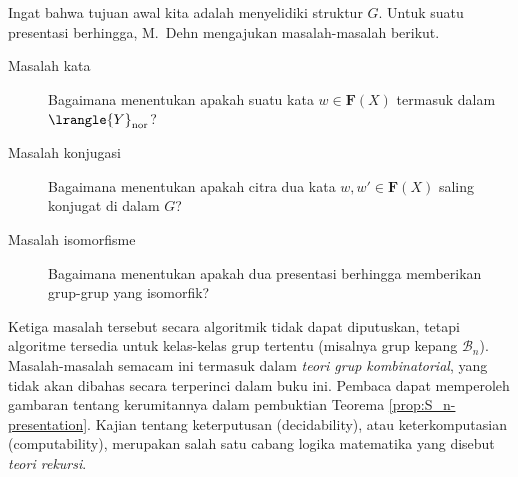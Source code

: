 Ingat bahwa tujuan awal kita adalah menyelidiki struktur $G$. Untuk suatu presentasi berhingga, M.\ Dehn \cite{De11} mengajukan masalah-masalah berikut.
\begin{description}
	\item[Masalah kata] Bagaimana menentukan apakah suatu kata $w \in \mathbf{F}(X)$ termasuk dalam $\lrangle{Y}_{\mathrm{nor}}$?
	\item[Masalah konjugasi] Bagaimana menentukan apakah citra dua kata $w, w' \in \mathbf{F}(X)$ saling konjugat di dalam $G$?
	\item[Masalah isomorfisme] Bagaimana menentukan apakah dua presentasi berhingga memberikan grup-grup yang isomorfik?
\end{description}
Ketiga masalah tersebut secara algoritmik tidak dapat diputuskan, tetapi algoritme tersedia untuk kelas-kelas grup tertentu (misalnya grup kepang $\mathcal{B}_n$). Masalah-masalah semacam ini termasuk dalam \emph{teori grup kombinatorial}, yang tidak akan dibahas secara terperinci dalam buku ini. Pembaca dapat memperoleh gambaran tentang kerumitannya dalam pembuktian Teorema \ref{prop:S_n-presentation}. Kajian tentang keterputusan (decidability), atau keterkomputasian (computability), merupakan salah satu cabang logika matematika yang disebut \emph{teori rekursi}.

